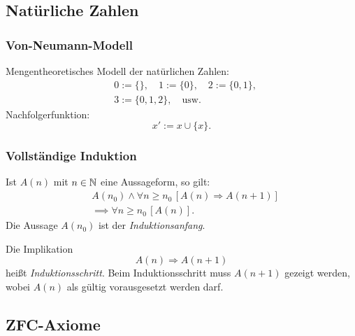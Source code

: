 \subsection{Natürliche Zahlen}
\subsubsection{Von-Neumann-Modell}
Mengentheoretisches Modell der natürlichen Zahlen:
\begin{equation}
\begin{split}
& 0:=\{\},\quad 1:=\{0\},\quad 2:=\{0,1\},\\
& 3:=\{0,1,2\},\quad \text{usw.}
\end{split}
\end{equation}
Nachfolgerfunktion:
\begin{equation}
x' := x\cup\{x\}.
\end{equation}
\subsubsection{Vollständige Induktion}
Ist $A(n)$ mit $n\in\mathbb N$
eine Aussageform, so gilt:
\begin{equation}
\begin{split}
& A(n_0)\land \forall n\ge n_0\,[A(n)\Rightarrow A(n+1)]\\
& \implies \forall n\ge n_0\,[A(n)].
\end{split}
\end{equation}
Die Aussage $A(n_0)$ ist der \emph{Induktionsanfang}.

Die Implikation
\begin{equation}
A(n)\Rightarrow A(n+1)
\end{equation}
heißt \emph{Induktionsschritt}. Beim Induktionsschritt muss
$A(n+1)$ gezeigt werden, wobei $A(n)$ als gültig vorausgesetzt werden
darf.

\newpage
\subsection{ZFC-Axiome}

